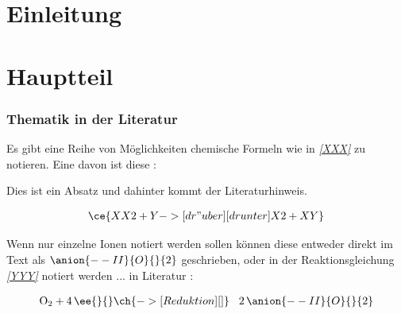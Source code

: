 \documentclass[a4paper,12pt,oneside,pointlessnumbers]{scrartcl}
\begin{document}
 
 
\begingroup
\pagestyle{empty} %
\tableofcontents %
\clearpage %
\endgroup

\newpage

\setcounter{page}{1} %

\part{Einleitung} %
\label{sec:Einleitung} %
\lipsum[2]			%

\part{Hauptteil}
\section{Thematik in der Literatur}
\lipsum[30]				%

Es gibt eine Reihe von Möglichkeiten chemische Formeln wie in \textsl{\ref{XXX}} zu notieren. Eine davon ist diese \cite[S.\,122]{demo}: 

Dies ist ein Absatz und dahinter kommt der Literaturhinweis.

\begin{equation}					%
\begin{aligned}						%
\label{XXX}							%
\ce{XX2 + Y ->[{dr"uber}][{drunter}] X2 + XY}
\end{aligned}
\end{equation}
\vspace{0.2cm}

Wenn nur einzelne Ionen notiert werden sollen können diese entweder direkt im Text als $\anion{--II}{O}{}{2}$ geschrieben, oder in der Reaktionsgleichung \textsl{\ref{YYY}} notiert werden ... in Literatur \cite{latexit}:

\begin{equation}					%
\begin{aligned}						%
\label{YYY}							%
\textnormal{O}_2 + 4\, \ee{}{}\ch{->[{Reduktion}][{}]} \hspace{0.3cm} 2\,\anion{--II}{O}{}{2} 
\end{aligned}
\end{equation}
\vspace{0.2cm}
\end{document}
